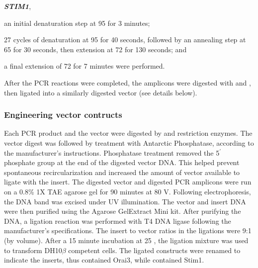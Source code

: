 \textbf{\itshape STIM1}, 
\begin{inparaenum}[(i)]
\item an initial denaturation step at 95 \textcelsius{} for 3 minutes;
\item 27 cycles of denaturation at 95 \textcelsius{} for 40 seconds, followed by an annealing step at 65 \textcelsius{} for 30 seconds, then extension at 72 \textcelsius{} for 130 seconds; and
\item a final extension of 72 \textcelsius{} for 7 minutes were performed. 
\end{inparaenum}

After the PCR reactions were completed, the amplicons were digested with \sali{} and \xbai, then ligated into a similarly digested \puchygmt{} vector (see details below).

\subsubsection{Engineering \droso{} vector contructs}
Each PCR product and the \puchygmt{} vector were digested by \sali{} and \xbai{} restriction enzymes. The vector digest was followed by treatment with Antarctic Phosphatase, according to the manufacturer's instructions. Phosphatase treatment removed the 5$^\prime$ phosphate group at the end of the digested vector DNA. This helped prevent spontaneous recircularization and increased the amount of vector available to ligate with the insert. The digested vector and digested PCR amplicons were run on a 0.8\% 1X TAE agarose gel for 90 minutes at 80 V. Following electrophoresis, the DNA band was excised under UV illumination. The vector and insert DNA were then purified using the Agarose GelExtract Mini kit. After purifying the DNA, a ligation reaction was performed with T4 DNA ligase following the manufacturer's specifications. The insert to vector ratios in the ligations were 9:1 (by volume). After a 15 minute incubation at 25 \textcelsius{}, the ligation mixture was used to transform DH10$\beta$ competent cells. The ligated constructs were renamed to indicate the inserts, thus %
\underline{\oraiiiivector{}} contained Orai3, while \underline{\stimivector{}} contained Stim1.

